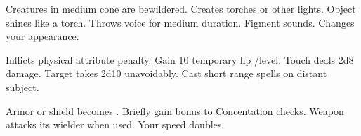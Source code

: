 \begin{swspelllist}
   Creatures in medium cone are bewildered.
   Creates torches or other lights.
   Object shines like a torch.
   Throws voice for medium duration.
   Figment sounds.
   Changes your appearance.

   Inflicts  physical attribute penalty.
   Gain 10 temporary hp /level.
   Touch deals 2d8 damage.
   Target takes 2d10 unavoidably.
   Cast short range spells on distant subject.

   Armor or shield becomes .
   Briefly gain bonus to Concentation checks.
   Weapon attacks its wielder when used.
   Your speed doubles.
\end{swspelllist}

